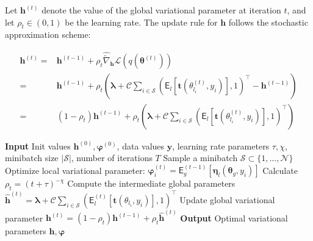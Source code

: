 Let $ \bm{h}^{(t)} $ denote the value of the global variational parameter at iteration $ t $, and let $ \rho_t \in (0,1) $ be the learning rate. The update rule for $ \bm{h} $ follows the stochastic approximation scheme:

\begin{equation}
\label{Robbins-Monro}
\begin{split}
\bm{h}^{(t)} =& \bm{h}^{(t-1)} + \rho_t \widehat{\widetilde{\nabla}}_{\bm{h}}\mathcal{L}(q(\bm\theta^{(t)}))\\
=& \bm{h}^{(t-1)} + \rho_t \left(\bm{\lambda}+\mathcal{C}\sum_{i \in \mathcal{S}}\left(\mathsf{E}_{l}\left[\bm{t}\left(\theta_{l_i}^{(t)},y_i\right)\right],1\right)^\top-\bm{h}^{(t-1)}\right)\\
 =& (1-\rho_t) \bm{h}^{(t-1)} + \rho_t \left(\bm{\lambda}+\mathcal{C}\sum_{i \in \mathcal{S}}\left(\mathsf{E}_{l}\left[\bm{t}\left(\theta_{l_i}^{(t)},y_i\right)\right],1\right)^\top\right) 
\end{split}
\end{equation}

\begin{algorithm}[H]
\caption{Stochastic Variational Inference (SVI)}
\begin{algorithmic}
\Statex \textbf{Input} Init values $\bm{h}^{(0)},\bm{\varphi}^{(0)}$, data values $\bm{y}$, learning rate parameters $\tau,\chi$, minibatch size $|\mathcal{S}|$, number of iterations $T$
    \State Sample a minibatch $\mathcal{S} \subset \{1,\dots,\mathcal{N}\}$
        \State Optimize local variational parameter:
        $\bm{\varphi}_{i}^{(t)} = \mathsf{E}^{(t-1)}_{g} \left[ \bm{\eta}_l(\bm{\theta}_g, y_i) \right]$
    \EndFor
    \State Calculate $\rho_t = (t+\tau)^{-\chi}$
    \State Compute the intermediate global parameters
    $\widehat{\bm{h}}^{(t)} = \bm{\lambda} +\mathcal{C}\sum_{i \in \mathcal{S}}\left(\mathsf{E}^{(t)}_{l} \left[ \bm{t}(\theta_{l_i}, y_i) \right],1\right)^\top$
    \State Update global variational parameter 
    $\bm{h}^{(t)} = (1 - \rho_t)\bm{h}^{(t-1)} + \rho_t \widehat{\bm{h}}^{(t)}$
\EndFor
\Statex \textbf{Output} Optimal variational parameters $\bm{h},\bm{\varphi}$
\end{algorithmic}
\label{alg:SVI_minibatch}
\end{algorithm}